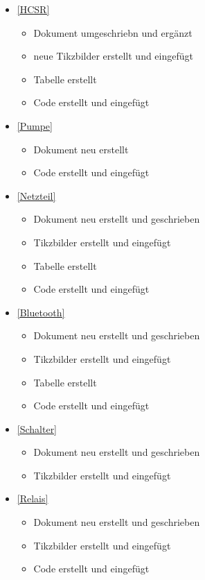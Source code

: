 \begin{itemize}
\item {}\ref{HCSR}
\begin{itemize}
	\item Dokument umgeschriebn und ergänzt 
	\item neue Tikzbilder erstellt und eingefügt
	\item Tabelle erstellt
	\item Code erstellt und eingefügt
\end{itemize}

\item {}\ref{Pumpe}
\begin{itemize}
	\item Dokument neu erstellt 
	\item Code erstellt und eingefügt
\end{itemize}

\item {}\ref{Netzteil}
\begin{itemize}
	\item Dokument neu erstellt und geschrieben
	\item Tikzbilder erstellt und eingefügt
	\item Tabelle erstellt
	\item Code erstellt und eingefügt
\end{itemize}

\item {}\ref{Bluetooth}
\begin{itemize}
	\item Dokument neu erstellt und geschrieben
	\item Tikzbilder erstellt und eingefügt
	\item Tabelle erstellt
	\item Code erstellt und eingefügt
\end{itemize}
 \item {}\ref{Schalter}
 	\begin{itemize}
 		\item Dokument neu erstellt und geschrieben
 		\item Tikzbilder erstellt und eingefügt
 	\end{itemize}
 	
 	\item {}\ref{Relais}
 	\begin{itemize}
 		\item Dokument neu erstellt und geschrieben
 		\item Tikzbilder erstellt und eingefügt
 		\item Code erstellt und eingefügt
 	\end{itemize}
 	

\end{itemize}
